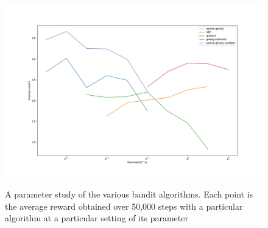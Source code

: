 \documentclass[a4paper,11pt]{article}
\numberwithin{equation}{section}
\theoremstyle{remark}
\begin{document}
\begin{figure}
	\centering
	\caption{A parameter study of the various bandit algorithms. Each point is the average reward obtained over 50,000 steps with a particular algorithm at a particular setting of its parameter}
	\includegraphics[scale=0.5]{ex2_11}
	\label{fig:KArmedBanditNonStationaryParameterStudy}
\end{figure}
\end{document}
